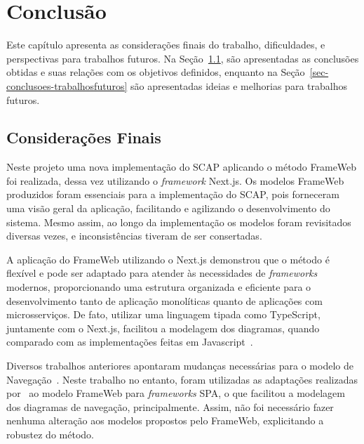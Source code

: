 \chapter{Conclusão}
\label{chap-conclusao}


Este capítulo apresenta as considerações finais do trabalho, dificuldades, e perspectivas para trabalhos futuros.
Na Seção~\ref{sec-conclusoes-consideracoes}, são apresentadas as conclusões obtidas e suas relações com os objetivos definidos, enquanto
na Seção~\ref{sec-conclusoes-trabalhosfuturos} são apresentadas ideias e melhorias para trabalhos futuros.

\section{Considerações Finais}
\label{sec-conclusoes-consideracoes}

Neste projeto uma nova implementação do SCAP aplicando o método FrameWeb foi realizada, dessa vez utilizando o \textit{framework} Next.js.
Os modelos FrameWeb produzidos foram essenciais para a implementação do SCAP, pois forneceram uma visão geral da aplicação, facilitando e agilizando o desenvolvimento do sistema.
Mesmo assim, ao longo da implementação os modelos foram revisitados diversas vezes, e inconsistências tiveram de ser consertadas.

A aplicação do FrameWeb utilizando o Next.js demonstrou que o método é flexível e pode ser adaptado para atender às necessidades de \textit{frameworks} modernos,
proporcionando uma estrutura organizada e eficiente para o desenvolvimento tanto de aplicação monolíticas quanto de aplicações com microsserviços.
De fato, utilizar uma linguagem tipada como TypeScript, juntamente com o Next.js, facilitou a modelagem dos diagramas, quando comparado com as implementações
feitas em Javascript~\cite{gomes:2022,dalapicola:2021}. 

Diversos trabalhos anteriores apontaram mudanças necessárias para o modelo de Navegação~\cite{duarte:2014,prado:2015,ferreira:2018,avelar:2018}.
Neste trabalho no entanto, foram utilizadas as adaptações realizadas por~ ao modelo FrameWeb para \textit{frameworks} SPA, o que facilitou 
a modelagem dos diagramas de navegação, principalmente. Assim, não foi necessário fazer nenhuma alteração aos modelos propostos pelo FrameWeb,
explicitando a robustez do método. 


